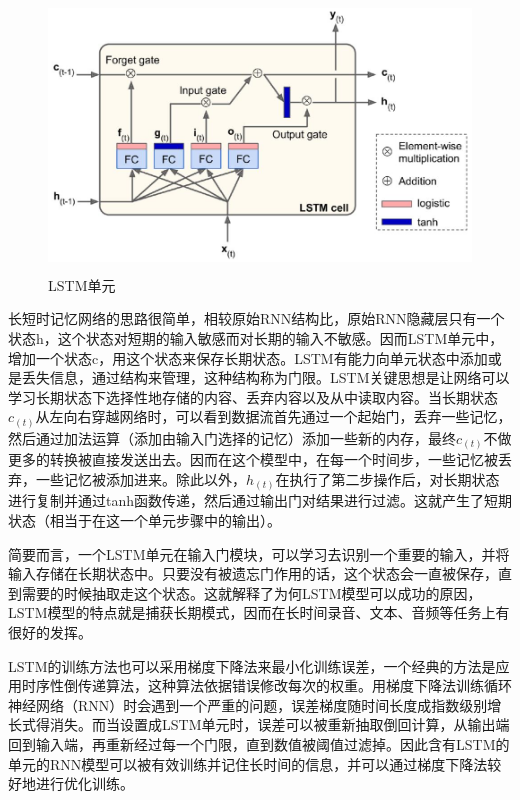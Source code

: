 \documentclass[winfonts,master,oneside,nobackinfo]{njuthesis}
\begin{document}
\begin{figure}[h]
\centering
\begin{minipage}[t]{\textwidth}
\includegraphics[width=1.0\textwidth,height=7.2cm]{./figure/LSTM.jpg}
\caption{LSTM单元}
\label{lab:1}
\end{minipage}
\end{figure}

长短时记忆网络的思路很简单，相较原始RNN结构比，原始RNN隐藏层只有一个状态h，这个状态对短期的输入敏感而对长期的输入不敏感。因而LSTM单元中，增加一个状态c，用这个状态来保存长期状态。LSTM有能力向单元状态中添加或是丢失信息，通过结构来管理，这种结构称为门限。LSTM关键思想是让网络可以学习长期状态下选择性地存储的内容、丢弃内容以及从中读取内容。当长期状态${ c } _ { ( t ) }$从左向右穿越网络时，可以看到数据流首先通过一个起始门，丢弃一些记忆，然后通过加法运算（添加由输入门选择的记忆）添加一些新的内存，最终${ c } _ { ( t ) }$不做更多的转换被直接发送出去。因而在这个模型中，在每一个时间步，一些记忆被丢弃，一些记忆被添加进来。除此以外，${ h } _ { ( t ) }$在执行了第二步操作后，对长期状态进行复制并通过tanh函数传递，然后通过输出门对结果进行过滤。这就产生了短期状态（相当于在这一个单元步骤中的输出）。

简要而言，一个LSTM单元在输入门模块，可以学习去识别一个重要的输入，并将输入存储在长期状态中。只要没有被遗忘门作用的话，这个状态会一直被保存，直到需要的时候抽取走这个状态。这就解释了为何LSTM模型可以成功的原因，LSTM模型的特点就是捕获长期模式，因而在长时间录音、文本、音频等任务上有很好的发挥。

LSTM的训练方法也可以采用梯度下降法来最小化训练误差，一个经典的方法是应用时序性倒传递算法，这种算法依据错误修改每次的权重。用梯度下降法训练循环神经网络（RNN）时会遇到一个严重的问题，误差梯度随时间长度成指数级别增长式得消失。而当设置成LSTM单元时，误差可以被重新抽取倒回计算，从输出端回到输入端，再重新经过每一个门限，直到数值被阈值过滤掉。因此含有LSTM的单元的RNN模型可以被有效训练并记住长时间的信息，并可以通过梯度下降法较好地进行优化训练。
\end{document}
